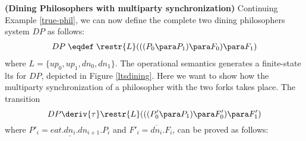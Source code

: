 \begin{example}\label{multi-sync-phil}{\bf (Dining Philosophers with multiparty synchronization)}
Continuing Example \ref{true-phil}, we can now define the complete two dining philosophers system $DP$
as follows:
\begin{eqnarray*}
DP \;  \eqdef \;  \restr{L}(((P_0\para P_1) \para F_0) \para F_1) 
\end{eqnarray*}
where $L = \{up_0, up_1, dn_0, dn_1\}$. The operational semantics generates a finite-state 
lts for $DP$, depicted in Figure \ref{ltsdining}. Here we want to show how the 
multiparty synchronization of a philosopher with the two forks takes place.
The transition 
\[
DP \deriv{\tau}  \restr{L}(((P'_0\para P_1) \para F'_0) \para F'_1) 
\]
where $P'_i = eat.\underline{dn_i}.dn_{i+1}.P_i$ and $F'_i = \overline{dn_i}.F_i$,
can be proved as follows:



\begin{center}


\end{center}
\end{example}
